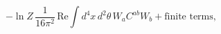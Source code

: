 \begin{equation}\label{Delta_GammaV}
- \ln Z\,\frac{1}{16\pi^2}\,
\mbox{Re}\int d^4x\,d^2\theta\,W_a C^{ab} W_b +\mbox{finite terms},
\end{equation}

